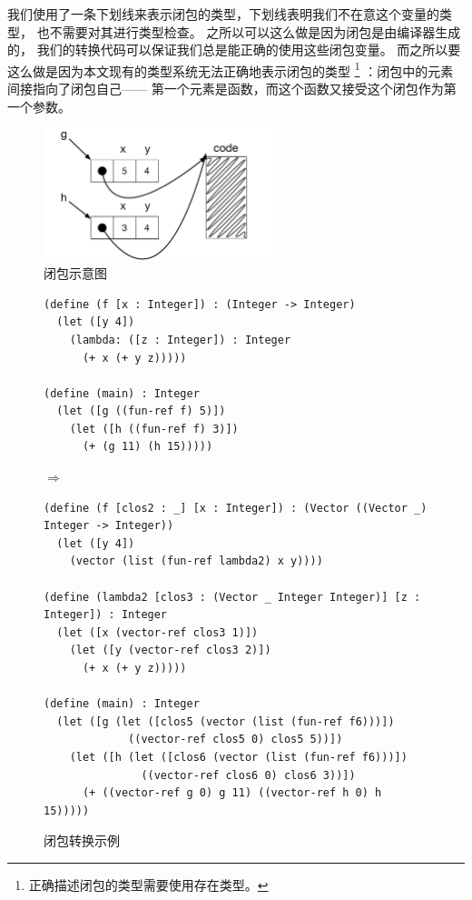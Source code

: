 我们使用了一条下划线来表示闭包的类型，下划线表明我们不在意这个变量的类型，
也不需要对其进行类型检查。
之所以可以这么做是因为闭包是由编译器生成的，
我们的转换代码可以保证我们总是能正确的使用这些闭包变量。
而之所以要这么做是因为本文现有的类型系统无法正确地表示闭包的类型
\footnote{正确描述闭包的类型需要使用存在类型\cite{Minamide_Morrisett_Harper_1996}。}
：闭包中的元素间接指向了闭包自己——
第一个元素是函数，而这个函数又接受这个闭包作为第一个参数。

\begin{figure}[t]
\centering \includegraphics[width=0.6\textwidth]{figures/closures}
\caption{闭包示意图}
\label{fig:closure-eg}
\end{figure}

\begin{figure}[tbp]
  \begin{minipage}{0.8\textwidth}
\begin{lstlisting}[basicstyle=\ttfamily\footnotesize]
(define (f [x : Integer]) : (Integer -> Integer)
  (let ([y 4])
    (lambda: ([z : Integer]) : Integer
      (+ x (+ y z)))))

(define (main) : Integer
  (let ([g ((fun-ref f) 5)])
    (let ([h ((fun-ref f) 3)])
      (+ (g 11) (h 15)))))
\end{lstlisting}
$\Rightarrow$
\begin{lstlisting}[basicstyle=\ttfamily\footnotesize]
(define (f [clos2 : _] [x : Integer]) : (Vector ((Vector _) Integer -> Integer))
  (let ([y 4])
    (vector (list (fun-ref lambda2) x y))))

(define (lambda2 [clos3 : (Vector _ Integer Integer)] [z : Integer]) : Integer
  (let ([x (vector-ref clos3 1)])
    (let ([y (vector-ref clos3 2)])
      (+ x (+ y z)))))

(define (main) : Integer
  (let ([g (let ([clos5 (vector (list (fun-ref f6)))])
             ((vector-ref clos5 0) clos5 5))])
    (let ([h (let ([clos6 (vector (list (fun-ref f6)))])
               ((vector-ref clos6 0) clos6 3))])
      (+ ((vector-ref g 0) g 11) ((vector-ref h 0) h 15)))))
\end{lstlisting}
\end{minipage}

\caption{闭包转换示例}
\label{fig:colure-conversion-eg}
\end{figure}


